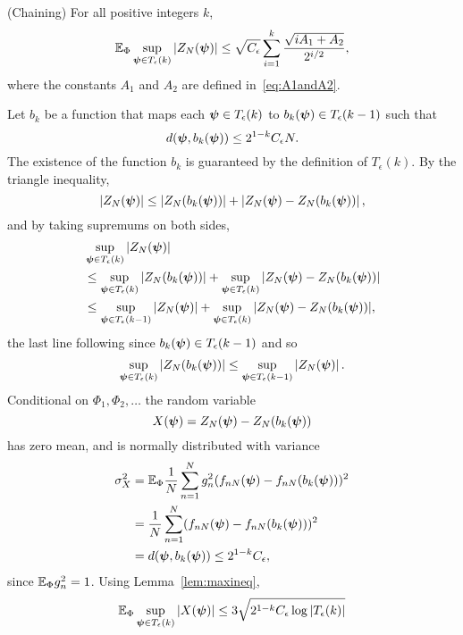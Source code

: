 \documentclass[journal]{IEEEtran}
\begin{document}
\begin{lemma}\label{lem:chaining3}(Chaining)
For all positive integers $k$,
\[
{\mathbb E}_{\Phi} \sup_{\boldsymbol{\psi} \in T_\epsilon(k) } \left\vert  Z_N(\boldsymbol{\psi})  \right\vert \leq \sqrt{C_\epsilon} \sum_{i=1}^{k}\frac{\sqrt{ i A_1 + A_2 }}{2^{i/2}},
\]
where the constants $A_1$ and $A_2$ are defined in~\eqref{eq:A1andA2}.
\end{lemma}
\begin{IEEEproof}
Let $b_k$ be a function that maps each $\boldsymbol{\psi} \in T_\epsilon(k)$ to $b_k(\boldsymbol{\psi}) \in T_\epsilon(k-1)$ such that 
\[
d(\boldsymbol{\psi},b_k(\boldsymbol{\psi})) \leq 2^{1-k} C_\epsilon N.
\]
The existence of the function $b_k$ is guaranteed by the definition of $T_\epsilon(k)$.  By the triangle inequality,
\[
\left\vert  Z_N(\boldsymbol{\psi})  \right\vert \leq \left\vert  Z_N(b_k(\boldsymbol{\psi}))  \right\vert + \left\vert  Z_N(\boldsymbol{\psi}) - Z_N(b_k(\boldsymbol{\psi}))   \right\vert,
\]
and by taking supremums on both sides,
\begin{align}
&\sup_{\psibf \in T_\epsilon(k) } \sabs{ Z_N(\psibf) } \nonumber \\ %
&\leq \sup_{\psibf \in T_\epsilon(k) } \sabs{ Z_N(b_k(\psibf)) } + \sup_{\psibf \in T_\epsilon(k) } \sabs{ Z_N(\psibf) - Z_N(b_k(\psibf))  } \nonumber \\
&\leq \sup_{\psibf \in T_\epsilon(k-1)} \sabs{ Z_N(\psibf) } + \sup_{\psibf \in T_\epsilon(k)} \sabs{ Z_N(\psibf) - Z_N(b_k(\psibf)) }, \label{eq:supZchain}
\end{align}
the last line following since $b_k(\boldsymbol{\psi}) \in T_\epsilon(k-1)$ and so 
\[
\sup_{\boldsymbol{\psi} \in T_\epsilon(k)} \left\vert  Z_N(b_k(\boldsymbol{\psi}))  \right\vert \leq \sup_{\boldsymbol{\psi} \in T_\epsilon(k-1)} \left\vert  Z_N(\boldsymbol{\psi})  \right\vert.
\]
Conditional on $\Phi_1, \Phi_2, \dots$ the random variable
\[
X(\boldsymbol{\psi}) = Z_N(\boldsymbol{\psi}) - Z_N(b_k(\boldsymbol{\psi}))
\]
has zero mean, and is normally distributed with variance
\begin{align*}
\sigma_X^2 &= {\mathbb E}_{\Phi} \frac{1}{N} \sum_{n=1}^N g_n^2 ( f_{nN}(\boldsymbol{\psi}) - f_{nN}(b_k(\boldsymbol{\psi})) )^2 \\
&= \frac{1}{N} \sum_{n=1}^N ( f_{nN}(\boldsymbol{\psi}) - f_{nN}(b_k(\boldsymbol{\psi})) )^2 \\
&= d(\boldsymbol{\psi}, b_k(\boldsymbol{\psi})) \leq 2^{1-k} C_\epsilon,
\end{align*}
since ${\mathbb E}_{\Phi} g_n^2 = 1$.  Using Lemma~\ref{lem:maxineq}, 
\begin{align*}
\expect_{\Phi} \sup_{\psibf \in T_\epsilon(k)} \sabs{X(\psibf)} &\leq 3\sqrt{2^{1-k} C_\epsilon \log\sabs{T_\epsilon(k)}} \\

\end{align*}
\end{IEEEproof}
\end{document}
